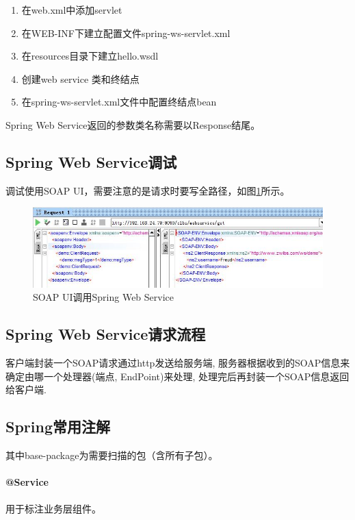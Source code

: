 \documentclass{book}
\begin{document}
\begin{enumerate}
	\setcounter{enumi}{0}
	\item{在web.xml中添加servlet}
	\item{在WEB-INF下建立配置文件spring-ws-servlet.xml}
	\item{在resources目录下建立hello.wsdl}
	\item{创建web service 类和终结点}
	\item{在spring-ws-servlet.xml文件中配置终结点bean}
\end{enumerate}

Spring Web Service返回的参数类名称需要以Response结尾。

\subsection{Spring Web Service调试}

调试使用SOAP UI，需要注意的是请求时要写全路径，如图\ref{fig:SoapUIRequest}所示。

\begin{figure}[htbp]
	\centering
	\includegraphics[scale=0.6]{SoapUIRequest.jpg}
	\caption{SOAP UI调用Spring Web Service}
	\label{fig:SoapUIRequest}
\end{figure}

\subsection{Spring Web Service请求流程}

客户端封装一个SOAP请求通过http发送给服务端, 服务器根据收到的SOAP信息来确定由哪一个处理器(端点, EndPoint)来处理, 处理完后再封装一个SOAP信息返回给客户端.

\subsection{Spring常用注解}

其中base-package为需要扫描的包（含所有子包）。


\paragraph{@Service}用于标注业务层组件。
\end{document}
